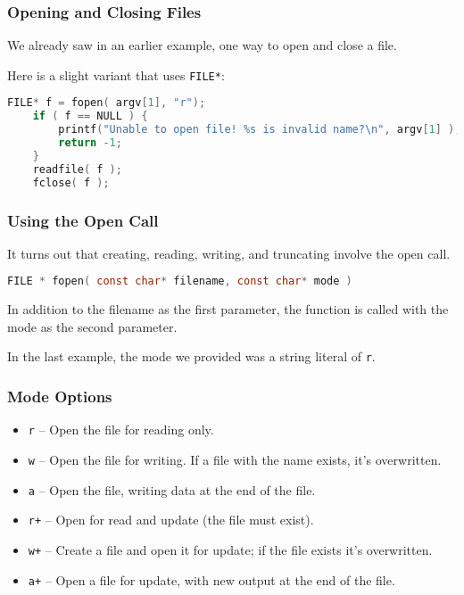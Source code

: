 \begin{frame}[fragile]
	\frametitle{Opening and Closing Files}
	We already saw in an earlier example, one way to open and close a file.
	
	Here is a slight variant that uses \texttt{FILE*}:
	
	\begin{lstlisting}[language=C]
    FILE* f = fopen( argv[1], "r");
    if ( f == NULL ) {
        printf("Unable to open file! %s is invalid name?\n", argv[1] );
        return -1;
    }
    readfile( f );
    fclose( f );
\end{lstlisting}
\end{frame}



\begin{frame}[fragile]
	\frametitle{Using the Open Call}

	It turns out that creating, reading, writing, and truncating involve the open call.

	\begin{lstlisting}[language=C]
FILE * fopen( const char* filename, const char* mode )
\end{lstlisting}

	In addition to the filename as the first parameter, the function is called with the mode as the second parameter.

	In the last example, the mode we provided was a string literal of \texttt{r}.

\end{frame}


\begin{frame}
	\frametitle{Mode Options}

	\begin{itemize}
		\item \texttt{r} -- Open the file for reading only.
		\item \texttt{w} -- Open the file for writing. If a file with the name exists, it's overwritten.
		\item \texttt{a} -- Open the file, writing data at the end of the file.
		\item \texttt{r+} -- Open for read and update (the file must exist).
		\item \texttt{w+} -- Create a file and open it for update; if the file exists it's overwritten.
		\item \texttt{a+} -- Open a file for update, with new output at the end of the file.
	\end{itemize}

\end{frame}


